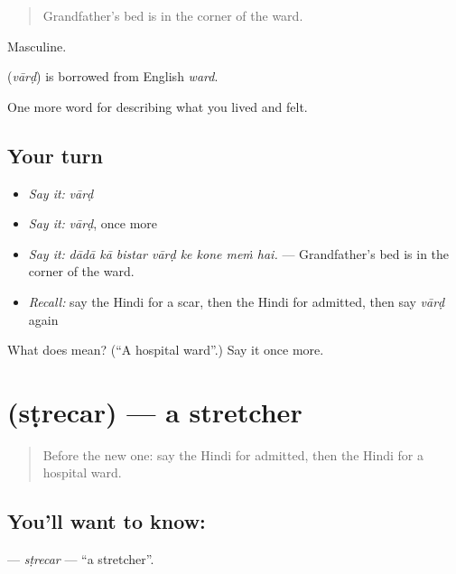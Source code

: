 \begin{quote}
Grandfather's bed is in the corner of the ward.
\end{quote}

Masculine.

\begin{cousinweb}
\textbf{} (\emph{vārḍ}) is borrowed from English \emph{ward}.
\end{cousinweb}

\begin{grammarlens}[title={What you've built}]
One more word for describing what you lived and felt.
\end{grammarlens}

\subsection*{Your turn}
\begin{itemize}
\raggedright
  \item \emph{Say it:} \emph{vārḍ}
  \item \emph{Say it:} \emph{vārḍ}, once more
  \item \emph{Say it:} \emph{dādā kā bistar vārḍ ke kone meṁ hai.} — Grandfather's bed is in the corner of the ward.
  \item \emph{Recall:} say the Hindi for a scar, then the Hindi for admitted, then say \emph{vārḍ} again
\end{itemize}

\begin{tcolorbox}[breakable,colback=teal!4,colframe=teal!35!black,title={Before you move on}]
What does  mean? (\textquotedblleft{}A hospital ward\textquotedblright{}.) Say it once more.
\end{tcolorbox}
\section[\texorpdfstring{\hi{स्ट्रेचर} (sṭrecar)}{स्ट्रेचर (sṭrecar)}]{ (sṭrecar) — a stretcher}

\label{lesson:HI-C491-strecar}



\begin{quote}
Before the new one: say the Hindi for admitted, then the Hindi for a hospital ward.
\end{quote}

\subsection*{You'll want to know: }
\textbf{} — \emph{sṭrecar} — \textquotedblleft{}a stretcher\textquotedblright{}.

